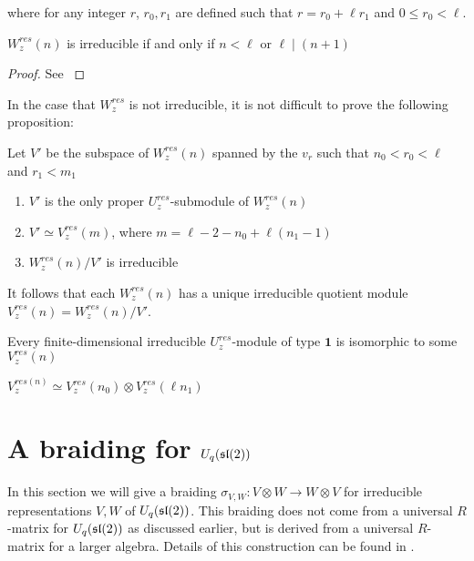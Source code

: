 where for any integer $r$, $r_0,r_1$ are defined such that $r = r_0 + \ell r_1$
and $0 \leq r_0 < \ell$. 

\begin{claim} $W_z^{res}(n)$ is irreducible if and only if $n < \ell$ or $\ell \mid (n+1)$
\end{claim}
\begin{proof}
See \cite{CP}
\end{proof}

In the case that $W_z^{res}$ is not irreducible, it is not difficult to prove the following proposition:

\begin{prop}
Let $V'$ be the subspace of $W_z^{res}(n)$ spanned by the $v_r$ such that $n_0 < r_0 < \ell$ and $r_1 < m_1$
\begin{enumerate}
    \renewcommand{\labelenumi}{\roman{enumi})}
    \item $V'$ is the only proper $U_z^{res}$-submodule of $W_z^{res}(n)$
    \item $V' \simeq V_z^{res}(m)$, where $m = \ell - 2 - n_0 + \ell(n_1 - 1)$
    \item $W_z^{res}(n) / V'$ is irreducible
\end{enumerate}
\end{prop}

It follows that each $W_z^{res}(n)$ has a unique irreducible quotient module $V_z^{res}(n) = W_z^{res}(n) / V'$. 

\begin{theorem}
Every finite-dimensional irreducible $U_z^{res}$-module of type $\mathbf{1}$ is isomorphic to some $V_z^{res}(n)$
\end{theorem}

\begin{theorem}
$V_z^{res(n)} \simeq V_z^{res}(n_0) \otimes V_{z}^{res}(\ell n_1)$
\end{theorem}

\section{A braiding for $U_q(\mathfrak{sl}(2))$}
\label{section:braiding}


In this section we will give a braiding $\sigma_{V,W}: V \otimes W \to W
\otimes V$ for irreducible representations $V,W$ of $U_q(\mathfrak{sl}(2))$. This
braiding does not come from a universal $R$-matrix for $U_q(\mathfrak{sl}(2))$ as
discussed earlier, but is derived from a universal $R$-matrix for a larger
algebra. Details of this construction can be found in \cite{CP}.



